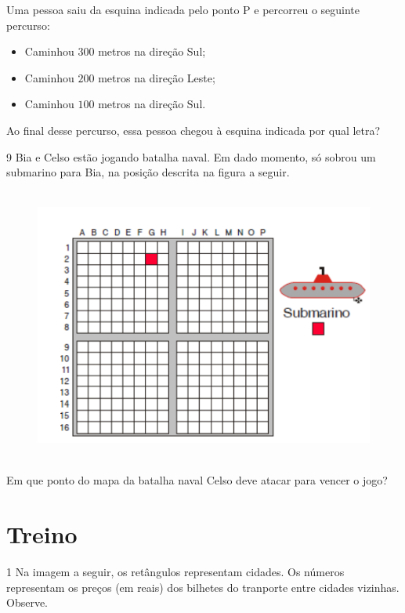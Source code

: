 Uma pessoa saiu da esquina indicada pelo ponto P e percorreu o seguinte
percurso:

\begin{itemize}
\item Caminhou $300$ metros na direção Sul;
\item Caminhou $200$ metros na direção Leste;
\item Caminhou $100$ metros na direção Sul.
\end{itemize}

Ao final desse percurso, essa pessoa chegou à esquina indicada por qual letra?


\num{9} Bia e Celso estão jogando batalha naval. Em dado momento, só sobrou
um submarino para Bia, na posição descrita na figura a seguir.

\begin{figure}[H]
\centering\includegraphics[width=5in,height=3.55208in]{./imgSAEB_6_MAT/media/image73.png}
\end{figure}

Em que ponto do mapa da batalha naval Celso deve atacar para vencer o jogo?


\section*{Treino}

\num{1}  Na imagem a seguir, os retângulos representam cidades. Os números
representam os preços (em reais) dos bilhetes do tranporte entre cidades vizinhas. Observe.

